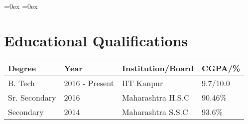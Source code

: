 \setlength\extrarowheight{3pt}  %
\aboverulesep=0ex  %
\belowrulesep=0ex  %

\section*{Educational Qualifications}
\begin{tabularx}{\textwidth}{|L|L|L|L|}

\toprule
\textbf{Degree} & \textbf{Year}  & \textbf{Institution/Board} & \textbf{CGPA/\%}\\
\midrule
B. Tech         & 2016 - Present & IIT Kanpur                 & 9.7/10.0\\
Sr. Secondary   & 2016           & Maharashtra H.S.C          & 90.46\%\\
Secondary       & 2014           & Maharashtra S.S.C          & 93.6\%\\
\bottomrule

\end{tabularx}\\[-1mm]
